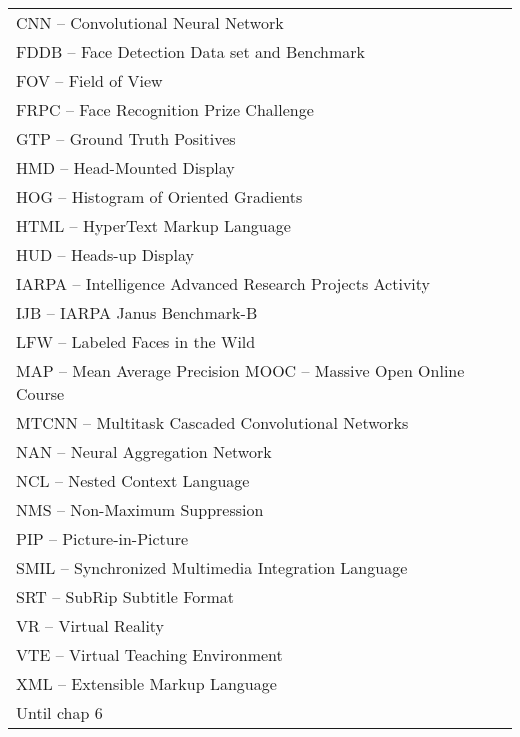 
\begin{thenotations}
\renewcommand{\arraystretch}{1.5}
  \noindent
  \begin{tabular}{ll}

CNN -- Convolutional Neural Network\\
FDDB -- Face Detection Data set and Benchmark\\
FOV -- Field of View\\
FRPC -- Face Recognition Prize Challenge\\
GTP -- Ground Truth Positives\\
HMD -- Head-Mounted Display\\
HOG -- Histogram of Oriented Gradients\\
HTML -- HyperText Markup Language\\
HUD -- Heads-up Display\\
IARPA -- Intelligence Advanced Research Projects Activity\\
IJB -- IARPA Janus Benchmark-B\\
LFW -- Labeled Faces in the Wild\\
MAP -- Mean Average Precision
MOOC -- Massive Open Online Course\\
MTCNN -- Multitask Cascaded Convolutional Networks\\
NAN -- Neural Aggregation Network\\
NCL -- Nested Context Language\\
NMS -- Non-Maximum Suppression\\
PIP -- Picture-in-Picture\\
SMIL -- Synchronized Multimedia Integration Language\\
SRT -- SubRip Subtitle Format\\
VR -- Virtual Reality\\
VTE -- Virtual Teaching Environment\\
XML -- Extensible Markup Language\\

Until chap 6

  \end{tabular}

\end{thenotations}